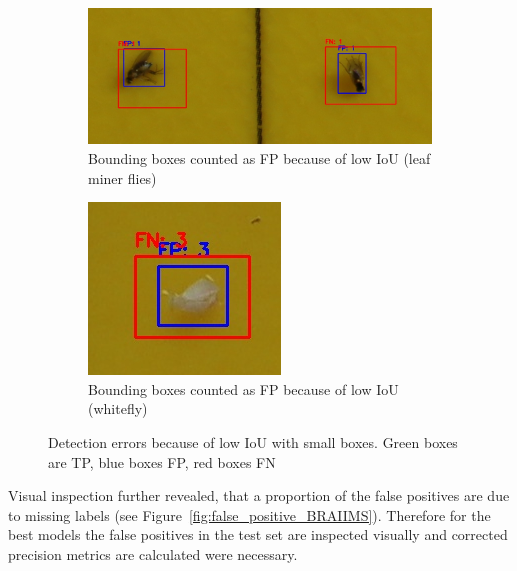 \documentclass[12pt,a4paper]{article}
\begin{document}
\begin{figure}[H]
    \begin{subfigure}[b]{0.45\textwidth}
        \centering
        \includegraphics[width=\textwidth]{images/low_iou_LIRIBO.png}
        \caption{Bounding boxes counted as FP because of low IoU (leaf miner flies)}
    \end{subfigure}
    \hfill
    \begin{subfigure}[b]{0.45\textwidth}
        \centering
        \includegraphics[width=\textwidth]{images/low_iou_TRIAVA.png}
        \caption{Bounding boxes counted as FP because of low IoU (whitefly)}
    \end{subfigure}
    
    \caption{Detection errors because of low IoU with small boxes. Green boxes are TP, blue boxes FP, red boxes FN}
    \label{fig:iou_problems}
\end{figure}

Visual inspection further revealed, that a proportion of the false positives are due to missing labels (see Figure~\ref{fig:false_positive_BRAIIMS}). Therefore for the best models the false positives in the test set are inspected visually and corrected precision metrics are calculated were necessary. 
\end{document}
